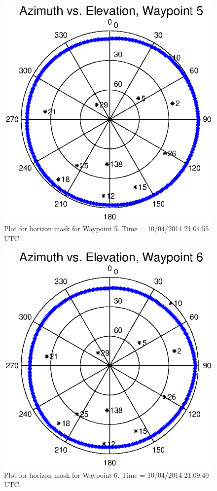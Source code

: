 \documentclass[]{aiaa-tc}%
\begin{document}
	\begin{figure}[H]
		\centering
		\includegraphics[width = 13cm]{AzElWaypoint5.eps}
		\caption{Plot for horizon mask for Waypoint 5. Time = 10/04/2014 21:04:55 UTC}
		\label{fig:AzElWaypoint5}
	\end{figure}
	
	\begin{figure}[H]
		\centering
		\includegraphics[width = 13cm]{AzElWaypoint6.eps}
		\caption{Plot for horizon mask for Waypoint 6. Time = 10/04/2014 21:09:40 UTC}
		\label{fig:AzElWaypoint6}
	\end{figure}
	
\end{document}
